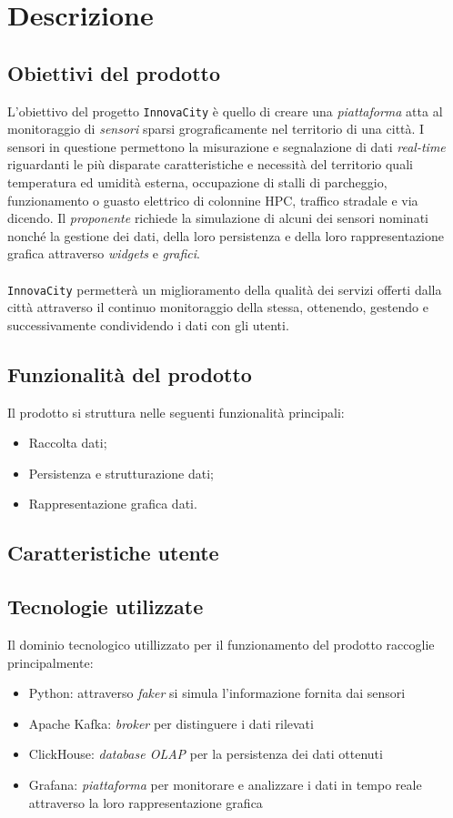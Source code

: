 \documentclass[8pt]{article}
\newcommand{\signatureline}[1]{%
	 \par\vspace{0.5cm}
	\noindent\makebox[\linewidth][r]{\rule{0.2\textwidth}{0.5pt}\hspace{3cm}\makebox[0pt][r]{\vspace{3pt}\footnotesize #1}}%
}
\begin{document}
\section{Descrizione}
\subsection{Obiettivi del prodotto}
L'obiettivo del progetto \texttt{InnovaCity} è quello di creare una \textit{piattaforma} atta al monitoraggio di \textit{sensori} sparsi grograficamente nel territorio di una città. I sensori in questione permettono la misurazione e segnalazione di dati \textit{real-time} riguardanti le più disparate caratteristiche e necessità del territorio quali temperatura ed umidità esterna, occupazione di stalli di parcheggio, funzionamento o guasto elettrico di colonnine HPC, traffico stradale e via dicendo. Il \textit{proponente} richiede la simulazione di alcuni dei sensori nominati nonché la gestione dei dati, della loro persistenza e della loro rappresentazione grafica attraverso \textit{widgets} e \textit{grafici}. \\\\\texttt{InnovaCity} permetterà un miglioramento della qualità dei servizi offerti dalla città attraverso il continuo monitoraggio della stessa, ottenendo, gestendo e successivamente condividendo i dati con gli utenti. 
\subsection{Funzionalità del prodotto}
Il prodotto si struttura nelle seguenti funzionalità principali:
\begin{itemize}
	\setlength\itemsep{0em}
	\item Raccolta dati;
	\item Persistenza e strutturazione dati;
	\item Rappresentazione grafica dati.
\end{itemize}
\subsection{Caratteristiche utente}
\subsection{Tecnologie utilizzate}
Il dominio tecnologico utillizzato per il funzionamento del prodotto raccoglie principalmente:
\begin{itemize}
	\setlength\itemsep{0em}
	\item Python: attraverso \textit{faker} si simula l'informazione fornita dai sensori
	\item Apache Kafka: \textit{broker} per distinguere i dati rilevati
	\item ClickHouse: \textit{database OLAP} per la persistenza dei dati ottenuti
	\item Grafana: \textit{piattaforma} per monitorare e analizzare i dati in tempo reale attraverso la loro rappresentazione grafica
\end{itemize}
\end{document}
